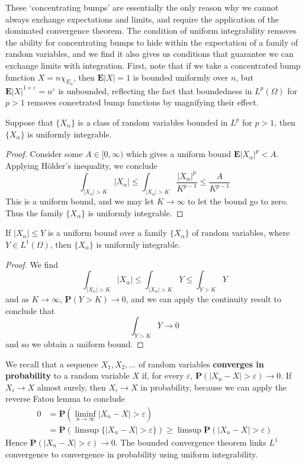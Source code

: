 These `concentrating bumps' are essentially the only reason why we cannot always exchange expectations and limits, and require the application of the dominated convergence theorem. The condition of uniform integrability removes the ability for concentrating bumps to hide within the expectation of a family of random variables, and we find it also gives us conditions that guarantee we can exchange limits with integration. First, note that if we take a concentrated bump function $X = n \chi_{E_n}$, then $\mathbf{E}|X| = 1$ is bounded uniformly over $n$, but $\mathbf{E}|X|^{1+\varepsilon} = n^\varepsilon$ is unbounded, reflecting the fact that boundedness in $L^p(\Omega)$ for $p > 1$ removes concetrated bump functions by magnifying their effect.

\begin{theorem}
    Suppose that $\{ X_\alpha \}$ is a class of random variables bounded in $L^p$ for $p > 1$, then $\{ X_\alpha \}$ is uniformly integrable.
\end{theorem}
\begin{proof}
    Consider some $A \in [0,\infty)$ which gives a uniform bound $\mathbf{E} |X_\alpha|^p < A$. Applying H\"{o}lder's inequality, we conclude
    \[ \int_{|X_\alpha| > K} |X_\alpha| \leq \int_{|X_\alpha| > K} \frac{|X_\alpha|^p}{K^{p-1}} \leq \frac{A}{K^{p-1}} \]
    This is a uniform bound, and we may let $K \to \infty$ to let the bound go to zero. Thus the family $\{ X_\alpha \}$ is uniformly integrable.
\end{proof}

\begin{corollary}
    If $|X_\alpha| \leq Y$ is a uniform bound over a family $\{ X_\alpha \}$ of random variables, where $Y \in L^1(\Omega)$, then $\{ X_\alpha \}$ is uniformly integrable.
\end{corollary}
\begin{proof}
    We find
    \[ \int_{|X_\alpha| > K} |X_\alpha| \leq \int_{|X_\alpha| > K} Y \leq \int_{Y > K} Y \]
    and as $K \to \infty$, $\mathbf{P}(Y > K) \to 0$, and we can apply the continuity result to conclude that
    \[ \int_{Y > K} Y \to 0 \]
    and so we obtain a uniform bound.
\end{proof}

We recall that a sequence $X_1, X_2, \dots$ of random variables {\bf converges in probability} to a random variable $X$ if, for every $\varepsilon$, $\mathbf{P}(|X_n - X| > \varepsilon) \to 0$. If $X_i \to X$ almost surely, then $X_i \to X$ in probability, because we can apply the reverse Fatou lemma to conclude
%
\begin{align*}
    0 &= \mathbf{P} \left( \liminf_{n \to \infty} |X_n - X| > \varepsilon \right)\\
    &= \mathbf{P} \left( \limsup \{ |X_n - X| > \varepsilon \} \right) \geq \limsup \mathbf{P}(|X_n - X| > \varepsilon)
\end{align*}
%
Hence $\mathbf{P}(|X_n - X| > \varepsilon) \to 0$. The bounded convergence theorem links $L^1$ convergence to convergence in probability using uniform integrability.

